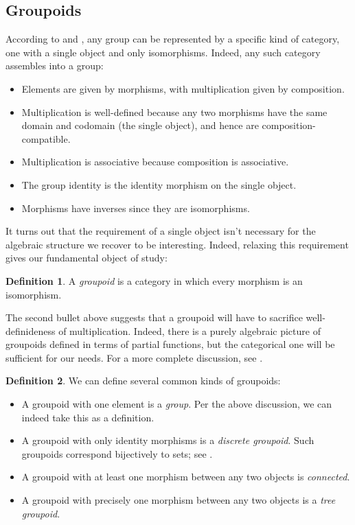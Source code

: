 \documentclass[11 pt]{amsart}
\theoremstyle{plain}   %
\theoremstyle{definition}
\newtheorem{defn}{Definition}[section]
\theoremstyle{remark}
\numberwithin{equation}{section}
\begin{document}
\subsection{Groupoids}\label{sec:groupoids}

According to  and , any group can
be represented by a specific kind of category, one with a single object and only
isomorphisms. Indeed, any such category assembles into a group:

\begin{itemize}
	\item Elements are given by morphisms, with multiplication given by
	      composition.
	\item Multiplication is well-defined because any two morphisms have the same
	      domain and codomain (the single object), and hence are
	      composition-compatible.
	\item Multiplication is associative because composition is associative.
	\item The group identity is the identity morphism on the single object.
	\item Morphisms have inverses since they are isomorphisms.
\end{itemize}

It turns out that the requirement of a single object isn't necessary for the
algebraic structure we recover to be interesting. Indeed, relaxing this
requirement gives our fundamental object of study:

\begin{defn}
	A \emph{groupoid} is a category in which every morphism is an isomorphism.
\end{defn}

The second bullet above suggests that a groupoid will have to sacrifice
well-definideness of multiplication. Indeed, there is a purely algebraic picture
of groupoids defined in terms of partial functions, but the categorical one will
be sufficient for our needs. For a more complete discussion, see \cite{Brown}.

\begin{defn}\label{groupoids}
	We can define several common kinds of groupoids:
	\begin{itemize}
		\item A groupoid with one element is a \emph{group}. Per the above
		      discussion, we can indeed take this as a definition.
		\item A groupoid with only identity morphisms is a \emph{discrete groupoid}.
		      Such groupoids correspond bijectively to sets; see .
		\item A groupoid with at least one morphism between any two objects is \emph{connected}.
		\item A groupoid with precisely one morphism between any two objects is a
		      \emph{tree groupoid}.
	\end{itemize}
\end{defn}
\end{document}
